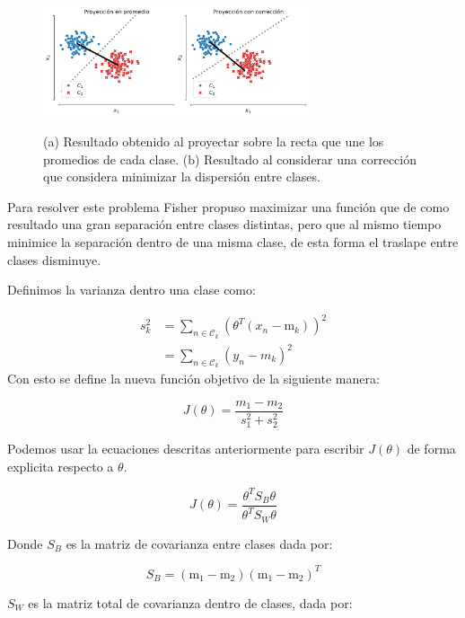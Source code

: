 \begin{figure}[H]
    \centering
    \includegraphics[width=0.7\textwidth]{img/cap2_dos_clases_proyeccion.pdf}\\
    \caption{(a) Resultado obtenido al proyectar sobre la recta que une los promedios de cada clase. (b) Resultado al considerar una corrección que considera minimizar la dispersión entre clases.}
    \label{fig:ej_fda}
\end{figure}

Para resolver este problema Fisher propuso maximizar una función que de como resultado una gran separación entre clases distintas, pero que al mismo tiempo minimice la separación dentro de una misma clase, de esta forma el traslape entre clases disminuye. 

Definimos la varianza dentro una clase como:

\begin{align}
    s_k^2 &= \sum_{n\in \mathcal{C}_k}(\theta^T(x_n-\text{m}_k))^2\\
    &= \sum_{n\in \mathcal{C}_k}(y_n-m_k)^2
\end{align}
Con esto se define la nueva función objetivo de la siguiente manera:

\begin{equation}
J(\theta) = \frac{m_1-m_2}{s_1^2+s_2 ^2}
\end{equation}

Podemos usar la ecuaciones descritas anteriormente para escribir $J(\theta)$ de forma explicita respecto a $\theta$.

\begin{equation}
    J(\theta) = \frac{\theta^TS_B\theta}{\theta^TS_W\theta}
\end{equation}

Donde $S_B$ es la matriz de covarianza entre clases dada por:

\begin{equation}
    S_B = (\text{m}_1-\text{m}_2)(\text{m}_1-\text{m}_2)^T
\end{equation}

$S_W$ es la matriz total de covarianza dentro de clases, dada por:

